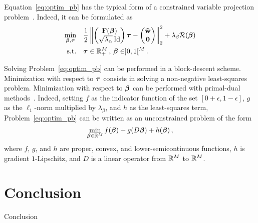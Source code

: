 Equation~\eqref{eq:optim_pb} has the typical form of a constrained variable
projection problem~\cite{Golub_G_2003_j-inv-prob_separable_nlsvpma}.
Indeed, it can be formulated as
\begin{equation}
  \begin{aligned}
    \min_{\boldsymbol{\beta},\boldsymbol{\tau}} \quad &
    \frac{1}{2} \left\lVert\begin{pmatrix}\mathbf{F}(\boldsymbol{\beta}) \\ \sqrt{\lambda_{\alpha}}\operatorname{\mathrm{Id}}\end{pmatrix}\boldsymbol{\tau}
        - \begin{pmatrix}\boldsymbol{\tilde{\mathbf{w}}}\\ \mathbf{0} \end{pmatrix}\right\rVert_{2}^{2}
    + \lambda_{\beta}\mathcal{R}(\boldsymbol{\beta}) \\
    \textrm{s.t.} \quad &
    \boldsymbol{\tau} \in \mathbb{R}^{M}_{+} \, , \, \boldsymbol{\beta} \in ]0,1[^{M} \, .
  \end{aligned}
\end{equation}

Solving Problem~\ref{eq:optim_pb} can be performed in a block-descent scheme.
Minimization with respect to $\boldsymbol{\tau}$ consists in solving a non-negative
least-squares problem.
Minimization with respect to $\boldsymbol{\beta}$ can be performed with primal-dual
methods~\cite{Komodakis_N_2015_j-ieee-sig-proc-mag_playing_d}.
Indeed, setting $f$ as the indicator function of the set $[0+\epsilon , 1-\epsilon]$, $g$ as
the $\ell_{1}$-norm multiplied by $\lambda_{\beta}$, and $h$ as the least-squares term,
Problem~\ref{eq:optim_pb} can be written as an unconstrained problem of
the form
\begin{equation}
  \label{eq:uncons_beta_optim}
  \min_{\bbeta\in\mathbb{R}^{M}} f(\bbeta) + g(D\bbeta) + h(\bbeta) \, ,
\end{equation}
where $f$, $g$, and $h$ are proper, convex, and lower-semicontinuous functions,
$h$ is gradient $1$-Lipschitz, and $D$ is a linear operator from $\mathbb{R}^{M}$ to
$\mathbb{R}^{M}$.


\section{}


\section{Conclusion}
\label{sec:concl}

Conclusion
